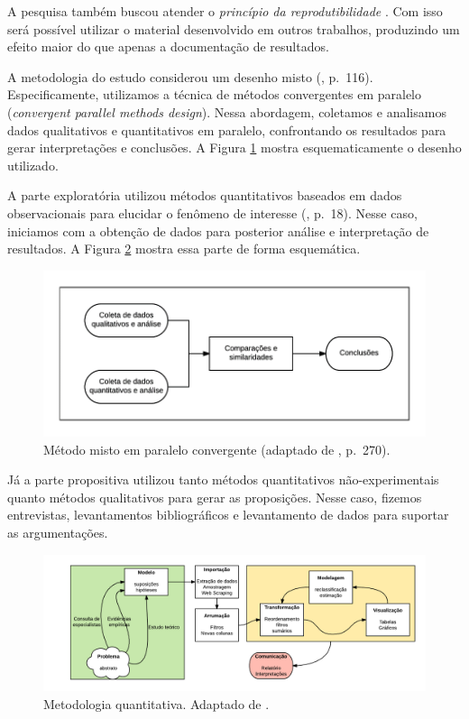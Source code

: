 \documentclass[]{report}
\begin{document}
A pesquisa também buscou atender o \emph{princípio da reprodutibilidade}
\citep{gelman2014bayesian}. Com isso será possível utilizar o material
desenvolvido em outros trabalhos, produzindo um efeito maior do que
apenas a documentação de resultados.

A metodologia do estudo considerou um desenho misto
(\citet{hanson2005mixed}, p.~116). Especificamente, utilizamos a técnica
de métodos convergentes em paralelo (\emph{convergent parallel methods
design}). Nessa abordagem, coletamos e analisamos dados qualitativos e
quantitativos em paralelo, confrontando os resultados para gerar
interpretações e conclusões. A Figura \ref{fig:desenho} mostra
esquematicamente o desenho utilizado.

A parte exploratória utilizou métodos quantitativos baseados em dados
observacionais para elucidar o fenômeno de interesse
(\citet{hanson2005mixed}, p.~18). Nesse caso, iniciamos com a obtenção
de dados para posterior análise e interpretação de resultados. A Figura
\ref{fig:quanti} mostra essa parte de forma esquemática.

\begin{figure}[!htbp]
\centering
\includegraphics{imgs/creswell.png}
\caption{Método misto em paralelo convergente (adaptado de
\citep{creswell2013research}, p.~270).}\label{fig:desenho}
\end{figure}

Já a parte propositiva utilizou tanto métodos quantitativos
não-experimentais quanto métodos qualitativos para gerar as proposições.
Nesse caso, fizemos entrevistas, levantamentos bibliográficos e
levantamento de dados para suportar as argumentações.

\begin{figure}[!htbp]
\centering
\includegraphics{imgs/quanti.png}
\caption{Metodologia quantitativa. Adaptado de
\citet{wickham2016r}.}\label{fig:quanti}
\end{figure}
\end{document}
